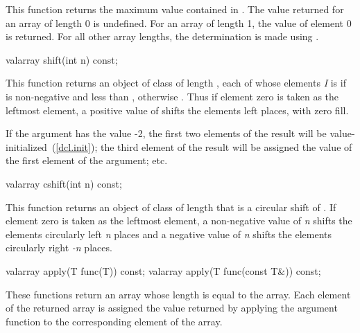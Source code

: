 \begin{itemdescr}
\pnum
This function returns the maximum value contained in
.
The value returned for an array of length 0 is undefined.
For an array
of length 1, the value of element 0 is returned.
For all other array
lengths, the determination is made using
.
\end{itemdescr}

%
\begin{itemdecl}
valarray shift(int n) const;
\end{itemdecl}

\begin{itemdescr}
\pnum
This function returns an object of class
of length
,
each of whose elements
\textit{I}
is
if
is non-negative and less than
,
otherwise
.
Thus if element zero is taken as the leftmost element,
a positive value of  shifts the elements left 
places, with zero fill.

\pnum
\begin{example}
If the argument has the value -2,
the first two elements of the result will be value-initialized~(\ref{dcl.init}); the third element of the result will be assigned the value
of the first element of the argument; etc.
\end{example}
\end{itemdescr}

%
\begin{itemdecl}
valarray cshift(int n) const;
\end{itemdecl}

\begin{itemdescr}
\pnum
This function returns an object of class
of length
that is a circular shift of . If element zero is taken as the leftmost element, a non-negative value of \emph{n} shifts the elements circularly left \emph{n} places and a negative value of \emph{n} shifts the elements circularly right \emph{-n} places.
\end{itemdescr}

%
\begin{itemdecl}
valarray apply(T func(T)) const;
valarray apply(T func(const T&)) const;
\end{itemdecl}

\begin{itemdescr}
\pnum
These functions return an array whose length is equal to the array.
Each element of the returned array is assigned
the value returned by applying the argument function to the
corresponding element of the array.
\end{itemdescr}


